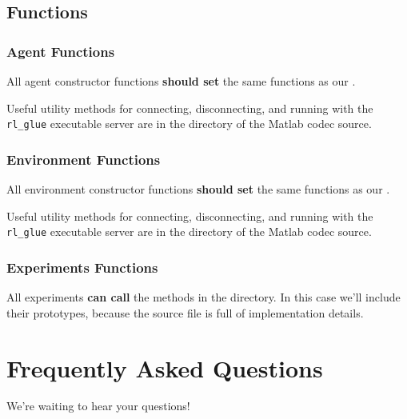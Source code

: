 \documentclass[11pt]{article}
\begin{document}
\subsection{Functions}
\subsubsection{Agent Functions}
All agent constructor functions \textbf{should set} the same functions as our .

Useful utility methods for connecting, disconnecting, and running with the \texttt{rl\_glue} executable server are in the  directory of the Matlab codec source.

\subsubsection{Environment Functions}
All environment constructor functions \textbf{should set} the same functions as our .

Useful utility methods for connecting, disconnecting, and running with the \texttt{rl\_glue} executable server are in the  directory of the Matlab codec source.

\subsubsection{Experiments Functions}
All experiments \textbf{can call} the methods in the   directory.
In this case we'll include their prototypes, because the source file is full of implementation details.


\section{Frequently Asked Questions}
We're waiting to hear your questions!
\end{document}
